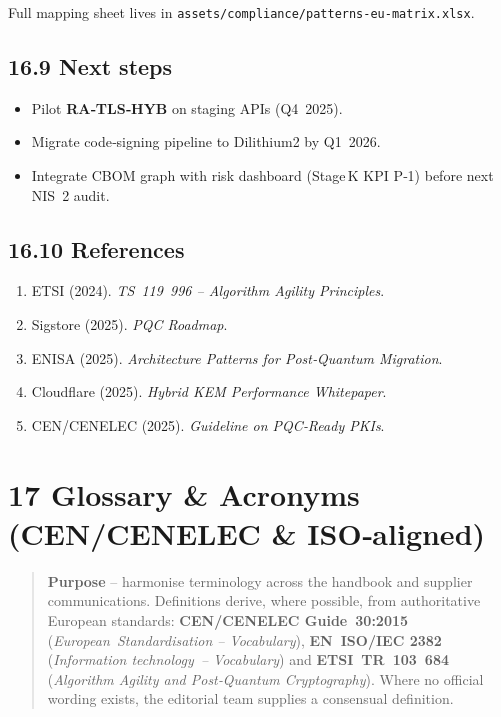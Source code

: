 \documentclass[
  english,
]{article}
\providecommand{\tightlist}{%
  \setlength{\itemsep}{0pt}\setlength{\parskip}{0pt}}
\begin{document}
Full mapping sheet lives in
\texttt{assets/compliance/patterns‑eu‑matrix.xlsx}.

\subsection{16.9 Next steps}\label{next-steps-3}

\begin{itemize}
\tightlist
\item
  Pilot \textbf{RA‑TLS‑HYB} on staging APIs (Q4~2025).
\item
  Migrate code‑signing pipeline to Dilithium2 by Q1~2026.
\item
  Integrate CBOM graph with risk dashboard (Stage\,K KPI P‑1) before
  next NIS~2 audit.
\end{itemize}

\subsection{16.10 References}\label{references-7}

\begin{enumerate}
\def\labelenumi{\arabic{enumi}.}
\tightlist
\item
  ETSI (2024). \emph{TS~119~996 -- Algorithm Agility Principles}.
\item
  Sigstore (2025). \emph{PQC Roadmap}.
\item
  ENISA (2025). \emph{Architecture Patterns for Post‑Quantum Migration}.
\item
  Cloudflare (2025). \emph{Hybrid KEM Performance Whitepaper}.
\item
  CEN/CENELEC (2025). \emph{Guideline on PQC‑Ready PKIs}.
\end{enumerate}

\section{17 Glossary \& Acronyms (CEN/CENELEC \&
ISO‑aligned)}\label{glossary-acronyms-cencenelec-isoaligned}

\begin{quote}
\textbf{Purpose} -- harmonise terminology across the handbook and
supplier communications. Definitions derive, where possible, from
authoritative European standards: \textbf{CEN/CENELEC Guide~30:2015}
(\emph{European~Standardisation -- Vocabulary}), \textbf{EN~ISO/IEC
2382} (\emph{Information technology~-- Vocabulary}) and
\textbf{ETSI~TR~103~684} (\emph{Algorithm Agility and Post‑Quantum
Cryptography}). Where no official wording exists, the editorial team
supplies a consensual definition.
\end{quote}
\end{document}
